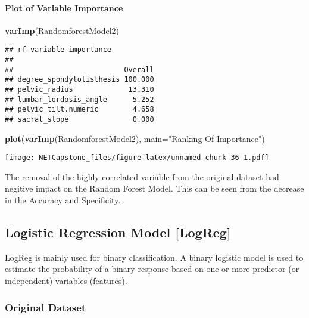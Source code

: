 \documentclass[
]{article}
\newenvironment{Shaded}{\begin{snugshade}}{\end{snugshade}}
\newcommand{\DataTypeTok}[1]{\textcolor[rgb]{0.13,0.29,0.53}{#1}}
\newcommand{\KeywordTok}[1]{\textcolor[rgb]{0.13,0.29,0.53}{\textbf{#1}}}
\newcommand{\NormalTok}[1]{#1}
\newcommand{\StringTok}[1]{\textcolor[rgb]{0.31,0.60,0.02}{#1}}
\begin{document}
\hypertarget{plot-of-variable-importance-1}{%
\paragraph{Plot of Variable
Importance}\label{plot-of-variable-importance-1}}

\begin{Shaded}
\begin{Highlighting}[]
\KeywordTok{varImp}\NormalTok{(RandomforestModel2)}
\end{Highlighting}
\end{Shaded}

\begin{verbatim}
## rf variable importance
## 
##                          Overall
## degree_spondylolisthesis 100.000
## pelvic_radius             13.310
## lumbar_lordosis_angle      5.252
## pelvic_tilt.numeric        4.658
## sacral_slope               0.000
\end{verbatim}

\begin{Shaded}
\begin{Highlighting}[]
\KeywordTok{plot}\NormalTok{(}\KeywordTok{varImp}\NormalTok{(RandomforestModel2), }\DataTypeTok{main=}\StringTok{"Ranking Of Importance"}\NormalTok{)}
\end{Highlighting}
\end{Shaded}

\texttt{[image: NETCapstone\_files/figure-latex/unnamed-chunk-36-1.pdf]}

The removal of the highly correlated variable from the original dataset
had negitive impact on the Random Forest Model. This can be seen from
the decrease in the Accuracy and Specificity.

\hypertarget{logistic-regression-model-logreg}{%
\subsection{Logistic Regression Model
{[}LogReg{]}}\label{logistic-regression-model-logreg}}

LogReg is mainly used for binary classification. A binary logistic model
is used to estimate the probability of a binary response based on one or
more predictor (or independent) variables (features).

\hypertarget{original-dataset-3}{%
\subsubsection{Original Dataset}\label{original-dataset-3}}
\end{document}
